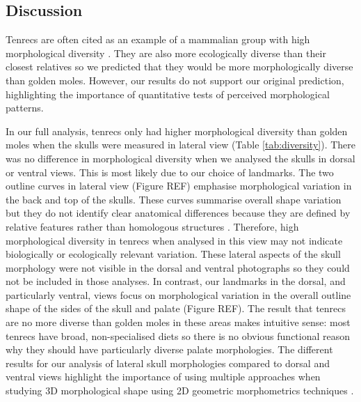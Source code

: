 \documentclass[12pt,a4paper]{article}
\begin{document}
\subsection{Discussion}
	Tenrecs are often cited as an example of a mammalian group with high morphological diversity \citep{Olson2013, Soarimalala2011, Eisenberg1969}. They are also more ecologically diverse than their closest relatives \citep{Soarimalala2011, Bronner1995} so we predicted that they would be more morphologically diverse than golden moles. However, our results do not support our original prediction, highlighting the importance of quantitative tests of perceived morphological patterns.

	In our full analysis, tenrecs only had higher morphological diversity than golden moles when the skulls were measured in lateral view (Table \ref{tab:diversity}). There was no difference in morphological diversity when we analysed the skulls in dorsal or ventral views. This is most likely due to our choice of landmarks. The two outline curves in lateral view (Figure REF) emphasise morphological variation in the back and top of the skulls. These curves summarise overall shape variation but they do not identify clear anatomical differences because they are defined by relative features rather than homologous structures \citep{Zelditch2012}. Therefore, high morphological diversity in tenrecs when analysed in this view may not indicate biologically or ecologically relevant variation.	
	These lateral aspects of the skull morphology were not visible in the dorsal and ventral photographs so they could not be included in those analyses. In contrast, our landmarks in the dorsal, and particularly ventral, views focus on morphological variation in the overall outline shape of the sides of the skull and palate (Figure REF). The result that tenrecs are no more diverse than golden moles in these areas makes intuitive sense: most tenrecs have broad, non-specialised diets \citep{Olson2013} so there is no obvious functional reason why they should have particularly diverse palate morphologies.
	The different results for our analysis of lateral skull morphologies compared to dorsal and ventral views highlight the importance of using multiple approaches when studying 3D morphological shape using 2D geometric morphometrics techniques \citep{Arnqvist1998}.
	
\end{document}
